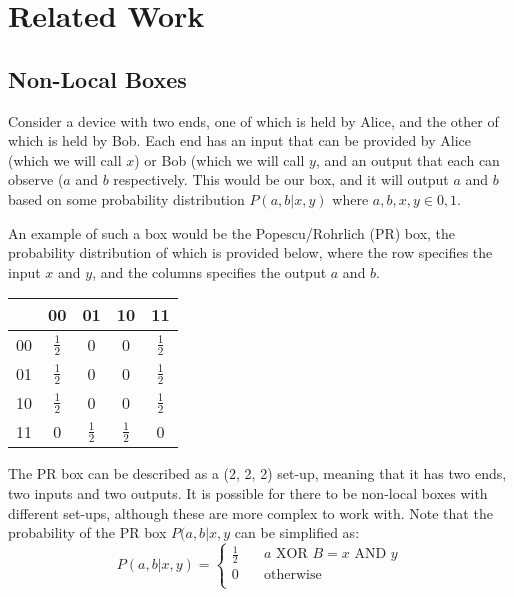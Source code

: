 \documentclass[report.tex]{subfiles}
\begin{document}
\chapter{Related Work} %
\label{cha:related_work}


\section{Non-Local Boxes} %
\label{sec:non_local_boxes}
Consider a device with two ends, one of which is held by Alice, and the other of
which is held by Bob. Each end has an input that can be provided by Alice (which
we will call \(x\)) or Bob (which we will call \(y\), and an output that each
can observe (\(a\) and \(b\) respectively. This would be our box, and it will
output \(a\) and \(b\) based on some probability distribution \(P(a, b | x, y)\)
where \(a, b, x, y \in {0, 1}\).

An example of such a box would be the Popescu/Rohrlich (PR) box, the probability
distribution of which is provided below, where the row specifies the input \(x\)
and \(y\), and the columns specifies the output \(a\) and \(b\).

\begin{center}
\begin{tabular}{l | c c c c}
  & 00 & 01 & 10 & 11 \\
  \hline
  00 & \(\frac{1}{2}\) & 0 & 0 & \(\frac{1}{2}\) \\
  01 & \(\frac{1}{2}\) & 0 & 0 & \(\frac{1}{2}\) \\
  10 & \(\frac{1}{2}\) & 0 & 0 & \(\frac{1}{2}\) \\
  11 & 0 & \(\frac{1}{2}\) & \(\frac{1}{2}\) & 0 \\
\end{tabular}
\end{center}

The PR box can be described as a (2, 2, 2) set-up, meaning that it has two ends,
two inputs and two outputs. It is possible for there to be non-local boxes with
different set-ups, although these are more complex to work with. Note that the
probability of the PR box \(P(a, b | x, y\) can be simplified as:
\[
    P(a, b | x, y) = 
    \begin{cases}
        \frac{1}{2} & \quad a \text{ XOR } B = x \text{ AND } y \\
        0 & \quad \text{otherwise} \\
    \end{cases}
\]
\end{document}
